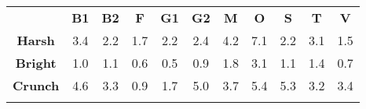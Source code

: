 \begin{tabular}{|c||c|c|c|c|c|c|c|c|c|c|}
	\cline{2-11}
	\multicolumn{1}{c|}{} & \bf{B1} & \bf{B2} & \bf{F} & \bf{G1} & \bf{G2} & \bf{M} & \bf{O} & \bf{S} & \bf{T} & \bf{V} \tabularnewline
	\hhline{~|-|-|-|-|-|-|-|-|-|-|}
	\noalign{\vspace{\doublerulesep}}
	\hhline{-||-|-|-|-|-|-|-|-|-|-|}
	\bf{Harsh} & 3.4 & 2.2 & 1.7 & 2.2 & 2.4 & 4.2 & 7.1 & 2.2 & 3.1 & 1.5 \tabularnewline
	\hhline{-||-|-|-|-|-|-|-|-|-|-|}
	\bf{Bright} & 1.0 & 1.1 & 0.6 & 0.5 & 0.9 & 1.8 & 3.1 & 1.1 & 1.4 & 0.7 \tabularnewline
	\hhline{-||-|-|-|-|-|-|-|-|-|-|}
	\bf{Crunch} & 4.6 & 3.3 & 0.9 & 1.7 & 5.0 & 3.7 & 5.4 & 5.3 & 3.2 & 3.4 \tabularnewline
	\hhline{-||-|-|-|-|-|-|-|-|-|-|}
\end{tabular}
